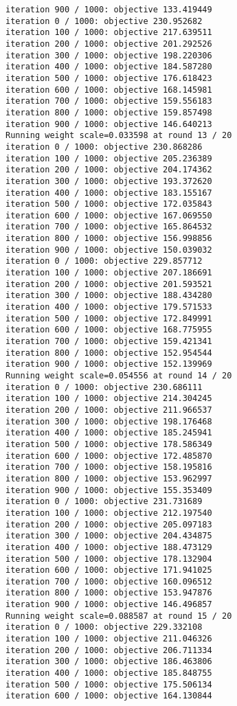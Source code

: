 \documentclass[11pt]{article}
\begin{document}
\begin{Verbatim}[commandchars=\\\{\}]
iteration 900 / 1000: objective 133.419449
iteration 0 / 1000: objective 230.952682
iteration 100 / 1000: objective 217.639511
iteration 200 / 1000: objective 201.292526
iteration 300 / 1000: objective 198.220306
iteration 400 / 1000: objective 184.587280
iteration 500 / 1000: objective 176.618423
iteration 600 / 1000: objective 168.145981
iteration 700 / 1000: objective 159.556183
iteration 800 / 1000: objective 159.857498
iteration 900 / 1000: objective 146.640213
Running weight scale=0.033598 at round 13 / 20
iteration 0 / 1000: objective 230.868286
iteration 100 / 1000: objective 205.236389
iteration 200 / 1000: objective 204.174362
iteration 300 / 1000: objective 193.372620
iteration 400 / 1000: objective 183.155167
iteration 500 / 1000: objective 172.035843
iteration 600 / 1000: objective 167.069550
iteration 700 / 1000: objective 165.864532
iteration 800 / 1000: objective 156.998856
iteration 900 / 1000: objective 150.039032
iteration 0 / 1000: objective 229.857712
iteration 100 / 1000: objective 207.186691
iteration 200 / 1000: objective 201.593521
iteration 300 / 1000: objective 188.434280
iteration 400 / 1000: objective 179.571533
iteration 500 / 1000: objective 172.849991
iteration 600 / 1000: objective 168.775955
iteration 700 / 1000: objective 159.421341
iteration 800 / 1000: objective 152.954544
iteration 900 / 1000: objective 152.139969
Running weight scale=0.054556 at round 14 / 20
iteration 0 / 1000: objective 230.686111
iteration 100 / 1000: objective 214.304245
iteration 200 / 1000: objective 211.966537
iteration 300 / 1000: objective 198.176468
iteration 400 / 1000: objective 185.245941
iteration 500 / 1000: objective 178.586349
iteration 600 / 1000: objective 172.485870
iteration 700 / 1000: objective 158.195816
iteration 800 / 1000: objective 153.962997
iteration 900 / 1000: objective 155.353409
iteration 0 / 1000: objective 231.731689
iteration 100 / 1000: objective 212.197540
iteration 200 / 1000: objective 205.097183
iteration 300 / 1000: objective 204.434875
iteration 400 / 1000: objective 188.473129
iteration 500 / 1000: objective 178.132904
iteration 600 / 1000: objective 171.941025
iteration 700 / 1000: objective 160.096512
iteration 800 / 1000: objective 153.947876
iteration 900 / 1000: objective 146.496857
Running weight scale=0.088587 at round 15 / 20
iteration 0 / 1000: objective 229.332108
iteration 100 / 1000: objective 211.046326
iteration 200 / 1000: objective 206.711334
iteration 300 / 1000: objective 186.463806
iteration 400 / 1000: objective 185.848755
iteration 500 / 1000: objective 175.506134
iteration 600 / 1000: objective 164.130844

\end{Verbatim}
\end{document}
